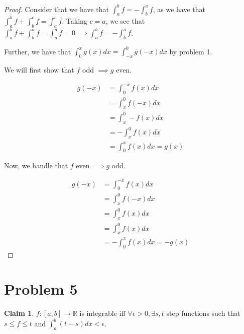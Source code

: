 \documentclass[12pt,letterpaper]{article}
\theoremstyle{definition}
\newtheorem*{claim}{Claim}
\newcommand{\R}{\mathbb{R}}
\begin{document}
\begin{proof}
  Consider that we have that $\int_a^bf = -\int_b^a f$, as we have that
  $\int_a^b f + \int_b^c f = \int_a^c f$. Taking $c =a$, we see that $\int_a^bf
  + \int_b^a f = \int_a^a f = 0 \implies \int_a^b f = -\int_b^a f$.

  Further, we have that $\int_0^x g(x)dx = \int_{-x}^0g(-x)dx$ by problem 1.

  We will first show that $f$ odd $\implies g$ even.

  \begin{align*}
    g(-x) &= \int_0^{-x}f(x)dx \\
          &= \int_x^0 f(-x)dx \\
          &= \int_x^0 -f(x)dx \\
          &= -\int_x^0 f(x)dx \\
          &= \int_0^x f(x)dx = g(x)
  \end{align*}

  Now, we handle that $f$ even $\implies g$ odd.

  \begin{align*}
    g(-x) &= \int_0^{-x}f(x)dx \\
          &= \int_x^0 f(-x)dx \\
          &= \int_x^0 f(x)dx \\
          &= \int_x^0 f(x)dx \\
          &= -\int_0^x f(x)dx = -g(x)
  \end{align*}
\end{proof}

\section*{Problem 5}

\begin{claim}
  $f: [a,b] \rightarrow \R$ is integrable iff $\forall \epsilon > 0, \exists
  s,t$ step functions such that $s \leq f \leq t$ and $\int_a^b(t - s)dx < \epsilon$.
\end{claim}
\end{document}
